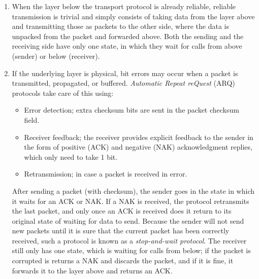 \documentclass[table, xcdraw]{article}%
\begin{document}
\begin{enumerate}
    \item When the layer below the transport protocol is already reliable, reliable transmission is trivial and simply consists of taking data from the layer above and transmitting those as packets to the other side, where the data is unpacked from the packet and forwarded above. Both the sending and the receiving side have only one state, in which they wait for calls from above (sender) or below (receiver).
    \item If the underlying layer is physical, bit errors may occur when a packet is transmitted, propagated, or buffered. \emph{Automatic Repeat reQuest} (ARQ) protocols take care of this using:

    \begin{itemize}
        \item Error detection; extra checksum bits are sent in the packet checksum field.
        \item Receiver feedback; the receiver provides explicit feedback to the sender in the form of positive (ACK) and negative (NAK) acknowledgment replies, which only need to take 1 bit.
        \item Retransmission; in case a packet is received in error.
    \end{itemize}
    
    After sending a packet (with checksum), the sender goes in the state in which it waits for an ACK or NAK. If a NAK is received, the protocol retransmits the last packet, and only once an ACK is received does it return to its original state of waiting for data to send. Because the sender will not send new packets until it is sure that the current packet has been correctly received, such a protocol is known as a \emph{stop-and-wait protocol}. The receiver still only has one state, which is waiting for calls from below; if the packet is corrupted is returns a NAK and discards the packet, and if it is fine, it forwards it to the layer above and returns an ACK.
    

\end{enumerate}
\end{document}
